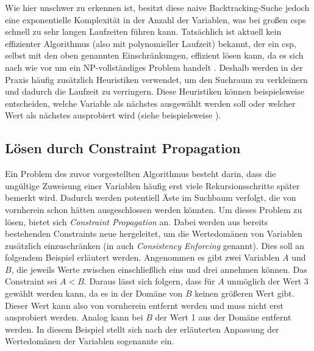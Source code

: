 Wie hier unschwer zu erkennen ist, besitzt diese naive Backtracking-Suche jedoch eine exponentielle Komplexität in der Anzahl der Variablen, was bei großen \acp*{csp} schnell zu
sehr langen Laufzeiten führen kann. Tatsächlich ist aktuell kein effizienter Algorithmus (also mit polynomieller Laufzeit) bekannt, der ein \ac*{csp}, selbst mit den oben genannten
Einschränkungen, effizient lösen kann, da es sich nach wie vor um ein NP-vollständiges Problem handelt \cite{BestCSPSearch}. Deshalb werden in der Praxis häufig zusätzlich
Heuristiken verwendet, um den Suchraum zu verkleinern und dadurch die Laufzeit zu verringern. Diese Heuristiken können beispielsweise entscheiden, welche Variable als nächstes
ausgewählt werden soll oder welcher Wert als nächstes ausprobiert wird (siehe beispielsweise \cite{OrderingHeuristics}).

\subsection{Lösen durch Constraint Propagation}
\label{sec:ConstrProp}
Ein Problem des zuvor vorgestellten Algorithmus besteht darin, dass die ungültige Zuweisung einer Variablen häufig erst viele Rekursionsschritte später bemerkt wird. Dadurch werden
potentiell Äste im Suchbaum verfolgt, die von vornherein schon hätten ausgeschlossen werden könnten. Um dieses Problem zu lösen, bietet sich \textit{Constraint Propagation}
an. Dabei werden aus bereits bestehenden Constraints neue hergeleitet, um die Wertedomänen von Variablen zusätzlich einzuschränken (in \cite{OrderingHeuristics} auch
\textit{Consistency Enforcing} genannt). Dies soll an folgendem Beispiel erläutert werden. Angenommen es gibt zwei Variablen $A$ und $B$, die jeweils Werte zwischen einschließlich
eins und drei annehmen können. Das Constraint sei $A < B$. Daraus lässt sich folgern, dass für $A$ unmöglich der Wert 3 gewählt werden kann, da es in der Domäne von $B$ keinen
größeren Wert gibt. Dieser Wert kann also von vornherein entfernt werden und muss nicht erst ausprobiert werden. Analog kann bei $B$ der Wert 1 aus der Domäne entfernt werden.
In diesem Beispiel stellt sich nach der erläuterten Anpassung der Wertedomänen der Variablen sogenannte  ein. 

